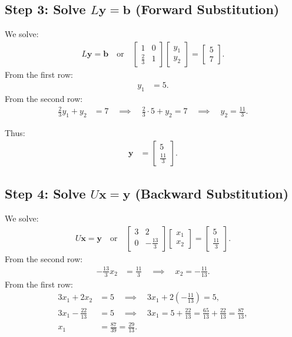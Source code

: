 \documentclass[journal]{IEEEtran}
\begin{document}
	\subsection*{Step 3: Solve $L\mathbf{y} = \mathbf{b}$ (Forward Substitution)}
	We solve:
	\begin{align}
		L\mathbf{y} = \mathbf{b} \quad \text{or} \quad \begin{bmatrix} 1 & 0 \\ \frac{2}{3} & 1 \end{bmatrix} \begin{bmatrix} y_1 \\ y_2 \end{bmatrix} = \begin{bmatrix} 5 \\ 7 \end{bmatrix}.
	\end{align}
	From the first row:
	\begin{align}
		y_1 &= 5.
	\end{align}
	From the second row:
	\begin{align}
		\frac{2}{3} y_1 + y_2 &= 7 \quad \implies \quad \frac{2}{3} \cdot 5 + y_2 = 7 \quad \implies \quad y_2 = \frac{11}{3}.
	\end{align}
	
	Thus:
	\begin{align}
		\mathbf{y} &= \begin{bmatrix} 5 \\ \frac{11}{3} \end{bmatrix}.
	\end{align}
	
	\subsection*{Step 4: Solve $U\mathbf{x} = \mathbf{y}$ (Backward Substitution)}
	We solve:
	\begin{align}
		U\mathbf{x} = \mathbf{y} \quad \text{or} \quad \begin{bmatrix} 3 & 2 \\ 0 & -\frac{13}{3} \end{bmatrix} \begin{bmatrix} x_1 \\ x_2 \end{bmatrix} = \begin{bmatrix} 5 \\ \frac{11}{3} \end{bmatrix}.
	\end{align}
	From the second row:
	\begin{align}
		-\frac{13}{3} x_2 &= \frac{11}{3} \quad \implies \quad x_2 = -\frac{11}{13}.
	\end{align}
	From the first row:
	\begin{align}
		3x_1 + 2x_2 &= 5 \quad \implies \quad 3x_1 + 2 \left( -\frac{11}{13} \right) = 5, \\
		3x_1 - \frac{22}{13} &= 5 \quad \implies \quad 3x_1 = 5 + \frac{22}{13} = \frac{65}{13} + \frac{22}{13} = \frac{87}{13}, \\
		x_1 &= \frac{87}{39} = \frac{29}{13}.
	\end{align}
	
\end{document}
